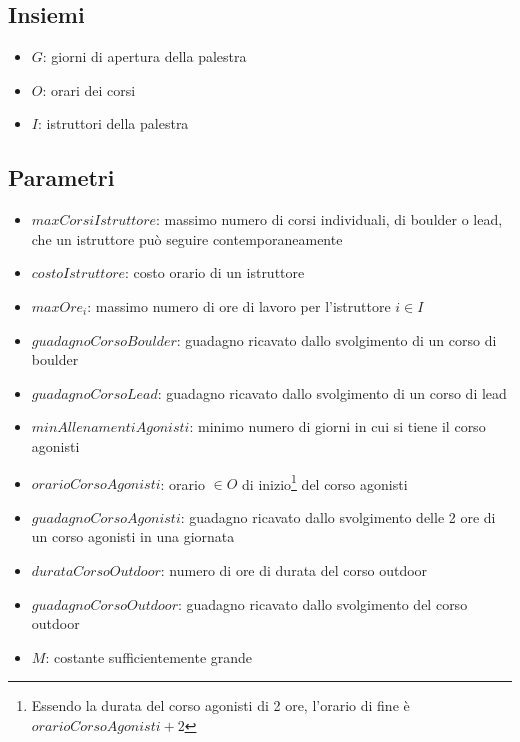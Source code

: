 \subsection{Insiemi}
\begin{itemize}
	\item $G$: giorni di apertura della palestra
	\item $O$: orari dei corsi
	\item $I$: istruttori della palestra
\end{itemize}

\subsection{Parametri}
\begin{itemize}
	\item $maxCorsiIstruttore$: massimo numero di corsi individuali, di boulder o lead, che un istruttore può seguire contemporaneamente
	\item $costoIstruttore$: costo orario di un istruttore
	\item $maxOre_i$: massimo numero di ore di lavoro per l'istruttore $i \in I$
	\item $guadagnoCorsoBoulder$: guadagno ricavato dallo svolgimento di un corso di boulder
	\item $guadagnoCorsoLead$: guadagno ricavato dallo svolgimento di un corso di lead
	\item $minAllenamentiAgonisti$: minimo numero di giorni in cui si tiene il corso agonisti
	\item $orarioCorsoAgonisti$: orario $\in O$ di inizio\footnote{Essendo la durata del corso agonisti di 2 ore, l'orario di fine è $orarioCorsoAgonisti + 2$} del corso agonisti
	\item $guadagnoCorsoAgonisti$: guadagno ricavato dallo svolgimento delle 2 ore di un corso agonisti in una giornata
	\item $durataCorsoOutdoor$: numero di ore di durata del corso outdoor
	\item $guadagnoCorsoOutdoor$: guadagno ricavato dallo svolgimento del corso outdoor
	\item $M$: costante sufficientemente grande
\end{itemize}

